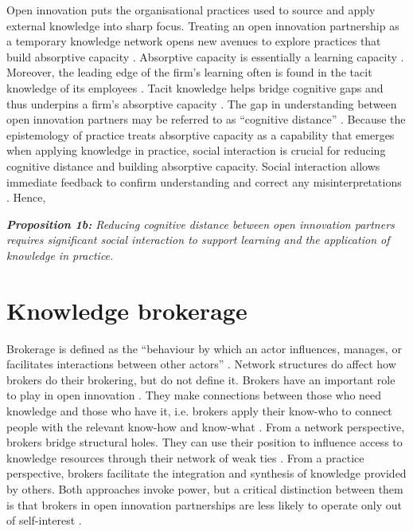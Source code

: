 Open innovation puts the organisational practices used to source and apply external knowledge into sharp focus. Treating an open innovation partnership as a temporary knowledge network opens new avenues to explore practices that build absorptive capacity \citep{vanhaverbeke2007connecting,xia2016unpacking}. Absorptive capacity is essentially a learning capacity \citep{cohen1989innovation, cohen1990absorptive, nooteboom2000learning, lichtenthaler2009absorptive, sun2010examination,knoppen2022absorptive}. Moreover, the leading edge of the firm's learning often is found in the tacit knowledge of its employees \citep{horvath2000working}. Tacit knowledge helps bridge cognitive gaps and thus underpins a firm's absorptive capacity \citep{thomas2021tacit}. The gap in understanding between open innovation partners may be referred to as \enquote{cognitive distance} \citep{nooteboom2000learning,nooteboom2007optimal}. Because the epistemology of practice treats absorptive capacity as a capability that emerges when applying knowledge in practice, social interaction is crucial for reducing cognitive distance and building absorptive capacity. Social interaction allows immediate feedback to confirm understanding and correct any misinterpretations \citep{haldin2000difficulties,gertler2003tacit,koskinen2003tacit}. Hence, \bigskip

\begin{tcolorbox}
\textit{\textbf{Proposition 1b:} Reducing cognitive distance between open innovation partners requires significant social interaction to support learning and the application of knowledge in practice.}
\end{tcolorbox}

\section{Knowledge brokerage} \label{sec:brokerage}

Brokerage is defined as the \enquote{behaviour by which an actor influences, manages, or facilitates interactions between other actors} \citep[][pg.~141]{obstfeld2014brokerage}. Network structures do affect how brokers do their brokering, but do not define it. Brokers have an important role to play in open innovation \citep{whelan2011creating,cococcioni2014exploring}. They make connections between those who need knowledge and those who have it, i.e. brokers apply their know-who to connect people with the relevant know-how and know-what \citep{davenport1998working}. From a network perspective, brokers bridge structural holes. They can use their position to influence access to knowledge resources through their network of weak ties \citep{burt1992structural,hanneman2005introduction,davis2010agency,simpson2011network,stovel2012brokerage}. From a practice perspective, brokers facilitate the integration and synthesis of knowledge provided by others. Both approaches invoke power, but a critical distinction between them is that brokers in open innovation partnerships are less likely to operate only out of self-interest \citep{lingo2010nexus,marabelli2016strategic}. \medskip

